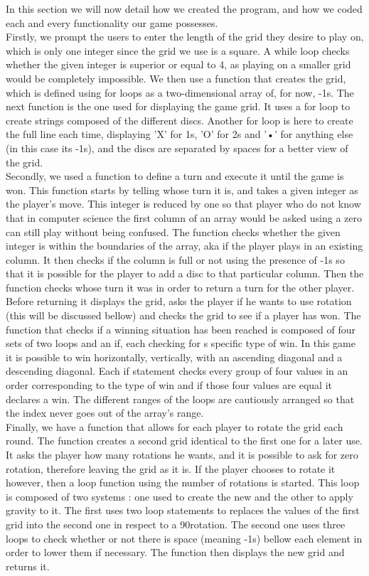 \documentclass{article}
\begin{document}
In this section we will now detail how we created the program, and how we coded each and every functionality our game possesses. \\
Firstly, we prompt the users to enter the length of the grid they desire to play on, which is only one integer since the grid we use is a square. A while loop checks whether the given integer is superior or equal to 4, as playing on a smaller grid would be completely impossible. We then use a function that creates the grid, which is defined using for loops as a two-dimensional array of, for now, -1s. The next function is the one used for displaying the game grid. It uses a for loop to create strings composed of the different discs. Another for loop is here to create the full line each time, displaying 'X' for 1s, 'O' for 2s and '•' for anything else (in this case its -1s), and the discs are separated by spaces for a better view of the grid. \\
Secondly, we used a function to define a turn and execute it until the game is won. This function starts by telling whose turn it is, and takes a given integer as the player's move. This integer is reduced by one so that player who do not know that in computer science the first column of an array would be asked using a zero can still play without being confused. The function checks whether the given integer is within the boundaries of the array, aka if the player plays in an existing column. It then checks if the column is full or not using the presence of -1s so that it is possible for the player to add a disc to that particular column. Then the function checks whose turn it was in order to return a turn for the other player. Before returning it displays the grid, asks the player if he wants to use rotation (this will be discussed bellow) and checks the grid to see if a player has won. The function that checks if a winning situation has been reached is composed of four sets of two loops and an if, each checking for s specific type of win. In this game it is possible to win horizontally, vertically, with an ascending diagonal and a descending diagonal. Each if statement checks every group of four values in an order corresponding to the type of win and if those four values are equal it declares a win. The different ranges of the loops are cautiously arranged so that the index never goes out of the array's range. \\
Finally, we have a function that allows for each player to rotate the grid each round. The function creates a second grid identical to the first one for a later use. It asks the player how many rotations he wants, and it is possible to ask for zero rotation, therefore leaving the grid as it is. If the player chooses to rotate it however, then a loop function using the number of rotations is started. This loop is composed of two systems : one used to create the new and the other to apply gravity to it. The first uses two loop statements to replaces the values of the first grid into the second one in respect to a 90\degree rotation. The second one uses three loops to check whether or not there is space (meaning -1s) bellow each element in order to lower them if necessary. The function then displays the new grid and returns it.
\end{document}
